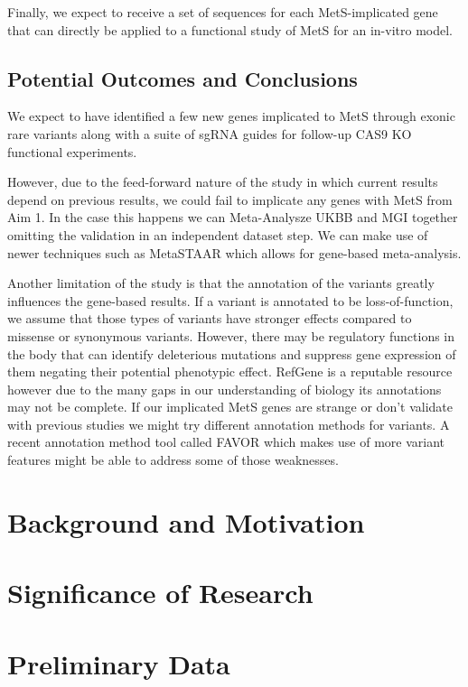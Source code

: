 \documentclass[11pt]{article}
\begin{document}
Finally, we expect to receive a set of sequences for each MetS-implicated gene that can directly be applied to a functional study of MetS for an in-vitro model.


\subsection*{Potential Outcomes and Conclusions}

We expect to have identified a few new genes implicated to MetS through exonic rare variants along with a suite of sgRNA guides for follow-up CAS9 KO functional experiments. 

However, due to the feed-forward nature of the study in which current results depend on previous results, we could fail to implicate any genes with MetS from Aim 1. In the case this happens we can Meta-Analysze UKBB and MGI together omitting the validation in an independent dataset step. We can make use of newer techniques such as MetaSTAAR which allows for gene-based meta-analysis.

Another limitation of the study is that the annotation of the variants greatly influences the gene-based results. If a variant is annotated to be loss-of-function, we assume that those types of variants have stronger effects compared to missense or synonymous variants. However, there may be regulatory functions in the body that can identify deleterious mutations and suppress gene expression of them negating their potential phenotypic effect. RefGene is a reputable resource however due to the many gaps in our understanding of biology its annotations may not be complete. If our implicated MetS genes are strange or don't validate with previous studies we might try different annotation methods for variants. A recent annotation method tool called FAVOR which makes use of more variant features might be able to address some of those weaknesses.


\newpage

\section*{Background and Motivation}



\section*{Significance of Research}

\section*{Preliminary Data}
\end{document}
